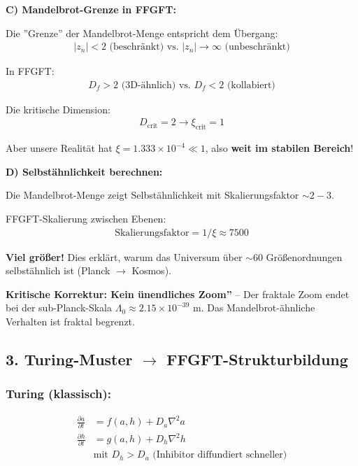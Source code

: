 \documentclass[12pt,a4paper]{article}
\begin{document}
	\textbf{C) Mandelbrot-Grenze in FFGFT:}
	
	Die ''Grenze'' der Mandelbrot-Menge entspricht dem Übergang:
	\begin{align*}
		|z_n| < 2 \text{ (beschränkt) vs. } |z_n| \to \infty \text{ (unbeschränkt)}
	\end{align*}
	
	In FFGFT:
	\begin{align*}
		D_f > 2 \text{ (3D-ähnlich) vs. } D_f < 2 \text{ (kollabiert)}
	\end{align*}
	
	Die kritische Dimension:
	\begin{align*}
		D_{\text{crit}} = 2 \rightarrow \xi_{\text{crit}} = 1
	\end{align*}
	
	Aber unsere Realität hat $\xi = 1.333 \times 10^{-4} \ll 1$, also \textbf{weit im stabilen Bereich}!
	
	\textbf{D) Selbstähnlichkeit berechnen:}
	
	Die Mandelbrot-Menge zeigt Selbstähnlichkeit mit Skalierungsfaktor $\sim 2-3$.
	
	FFGFT-Skalierung zwischen Ebenen:
	\begin{align*}
		\text{Skalierungsfaktor} = 1/\xi \approx 7500
	\end{align*}
	
	\textbf{Viel größer!} Dies erklärt, warum das Universum über $\sim 60$ Größenordnungen selbstähnlich ist (Planck $\to$ Kosmos).
	
	\textbf{Kritische Korrektur: Kein ünendliches Zoom''} – Der fraktale Zoom endet bei der sub-Planck-Skala $\Lambda_0 \approx 2.15 \times 10^{-39}$ m. Das Mandelbrot-ähnliche Verhalten ist fraktal begrenzt.
	
	\subsection*{3. Turing-Muster $\rightarrow$ FFGFT-Strukturbildung}
	
	\subsubsection*{Turing (klassisch):}
	\begin{align*}
		\frac{\partial a}{\partial t} &= f(a,h) + D_a \nabla^2 a \\
		\frac{\partial h}{\partial t} &= g(a,h) + D_h \nabla^2 h \\
		&\text{mit } D_h > D_a \text{ (Inhibitor diffundiert schneller)}
	\end{align*}
	
\end{document}

